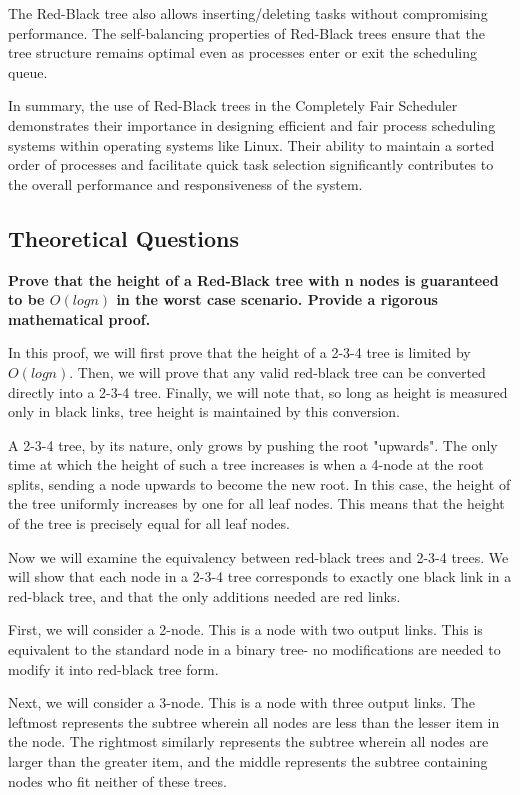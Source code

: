 \documentclass[12pt]{amsart}
\begin{document}
   The Red-Black tree also allows inserting/deleting tasks without compromising performance. The self-balancing properties of Red-Black trees ensure that the tree structure remains optimal even as processes enter or exit the scheduling queue.
   
   In summary, the use of Red-Black trees in the Completely Fair Scheduler demonstrates their  importance in designing efficient and fair process scheduling systems within operating systems like Linux. Their ability to maintain a sorted order of processes and facilitate quick task selection significantly contributes to the overall performance and responsiveness of the system.

\subsection{Theoretical Questions}

    \textbf{Prove that the height of a Red-Black tree with
    n nodes is guaranteed to be $O(log n)$ in the worst
    case scenario. Provide a rigorous mathematical proof.}
    
    In this proof, we will first prove that the height of a
    2-3-4 tree is limited by $O(log n)$. Then, we will prove
    that any valid red-black tree can be converted directly into
    a 2-3-4 tree. Finally, we will note that, so long as height
    is measured only in black links, tree height is maintained
    by this conversion.

    A 2-3-4 tree, by its nature, only grows by pushing the root
    "upwards". The only time at which the height of such a tree
    increases is when a 4-node at the root splits, sending a
    node upwards to become the new root. In this case, the
    height of the tree uniformly increases by one for all leaf
    nodes. This means that the height of the tree is precisely
    equal for all leaf nodes.

    Now we will examine the equivalency between red-black trees
    and 2-3-4 trees. We will show that each node in a 2-3-4 tree
    corresponds to exactly one black link in a red-black tree,
    and that the only additions needed are red links.

    First, we will consider a 2-node. This is a node with two
    output links. This is equivalent to the standard node in a
    binary tree- no modifications are needed to modify it into
    red-black tree form.

    Next, we will consider a 3-node. This is a node with three
    output links. The leftmost represents the subtree wherein
    all nodes are less than the lesser item in the node. The
    rightmost similarly represents the subtree wherein all nodes
    are larger than the greater item, and the middle represents
    the subtree containing nodes who fit neither of these trees.
\end{document}
